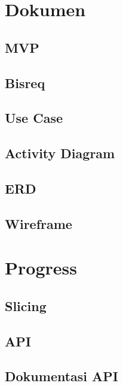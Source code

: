 \documentclass[a4paper,oneside,11pt]{book}
\begin{document}
\renewcommand{\cftchappresnum}{Bab~}
\renewcommand{\cftchapaftersnum}{.}
\renewcommand{\cftchapnumwidth}{3.5em}
\renewcommand{\cftchapfont}{\bfseries}
\renewcommand{\cftchappagefont}{\bfseries}

\setlength{\cftbeforechapskip}{0.8em} %
\setlength{\cftbeforesecskip}{0.2em}  %
\renewcommand{\cftsecfont}{\normalfont}
\renewcommand{\cftsubsecfont}{\normalfont}

\renewcommand{\contentsname}{\centering Daftar Isi}
\renewcommand{\listfigurename}{\centering Daftar Gambar}
\renewcommand{\lstlistlistingname}{\centering Daftar Kode}

\renewcommand{\cftloftitlefont}{\hfill\normalfont\LARGE\bfseries}
\renewcommand{\cftafterloftitle}{\hfill}

\tableofcontents

\newpage
\listoffigures

\newpage

\chapter{Dokumen}
\section{MVP}
\section{Bisreq}
\section{Use Case}
\section{Activity Diagram}
\section{ERD}
\section{Wireframe}

\chapter{Progress}
\section{Slicing}
\section{API}
\section{Dokumentasi API}
\end{document}
